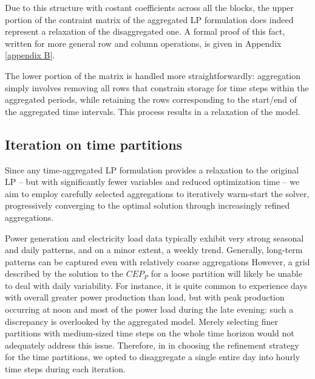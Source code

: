 \documentclass[smallextended,natbib]{svjour3}       %
\numberwithin{definition}{section}
\numberwithin{theorem}{section}
\numberwithin{proposition}{section}
\begin{document}
Due to this structure with costant coefficients across all the blocks, the upper portion of the contraint matrix of the aggregated LP formulation does indeed represent a relaxation of the disaggregated one.
A formal proof of this fact, written for more general row and column operations, is given in Appendix \ref{appendix B}.

The lower portion of the matrix is handled more straightforwardly: aggregation simply involves removing all rows that constrain storage for time steps within the aggregated periods, while retaining the rows corresponding to the start/end of the aggregated time intervals. 
This process results in a relaxation of the model.














\subsection{Iteration on time partitions}\label{subsection: iter}

Since any time-aggregated LP formulation provides a relaxation to the original LP -- but with significantly fewer variables and reduced optimization time -- 
we aim to employ carefully selected aggregations to iteratively warm-start the solver, progressively converging to the optimal solution through increasingly refined aggregations.

Power generation and electricity load data typically exhibit very strong seasonal and daily patterns, and on a minor extent, a weekly trend.
Generally, long-term patterns can be captured even with relatively coarse aggregations
However, a grid described by the solution to the $CEP_{P}$ for a loose partition will likely be unable to deal with daily variability. 
For instance, it is quite common to experience days with overall greater power production than load, but with peak production occurring at noon and most of the power load during the late evening: such a discrepancy is overlooked by the aggregated model. 
Merely selecting finer partitions with medium-sized time steps on the whole time horizon would not adequately address this issue. 
Therefore, in in choosing the refinement strategy for the time partitions, we opted to disaggregate a single entire day into hourly time steps during each iteration.
\end{document}
